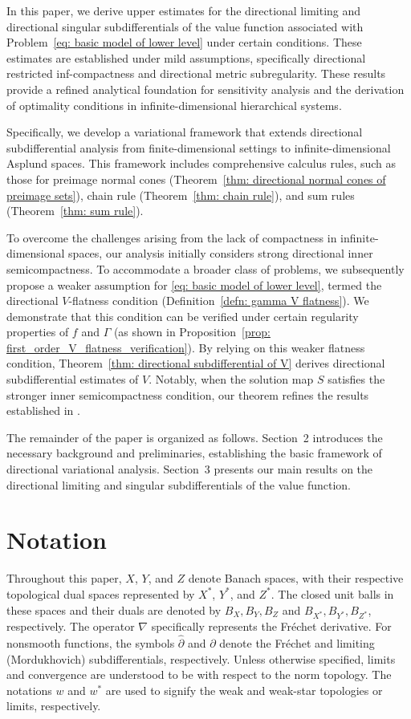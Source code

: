 \documentclass[12pt,twoside,reqno]{amsart}
\theoremstyle{definition}
\numberwithin{equation}{section}
\begin{document}
In this paper, we derive upper estimates for the directional limiting and directional singular subdifferentials of the value function associated with Problem~\eqref{eq: basic model of lower level} under certain conditions. These estimates are established under mild assumptions, specifically directional restricted inf-compactness and directional metric subregularity. These results provide a refined analytical foundation for sensitivity analysis and the derivation of optimality conditions in infinite-dimensional hierarchical systems.

Specifically, we develop a variational framework that extends directional subdifferential analysis from finite-dimensional settings to infinite-dimensional Asplund spaces. This framework includes comprehensive calculus rules, such as those for preimage normal cones (Theorem~\ref{thm: directional normal cones of preimage sets}), chain rule (Theorem~\ref{thm: chain rule}), and sum rules (Theorem~\ref{thm: sum rule}).

To overcome the challenges arising from the lack of compactness in infinite-dimensional spaces, our analysis initially considers strong directional inner semicompactness. To accommodate a broader class of problems, we subsequently propose a weaker assumption for \eqref{eq: basic model of lower level}, termed the directional $V$-flatness condition (Definition~\ref{defn: gamma V flatness}). We demonstrate that this condition can be verified under certain regularity properties of $f$ and $\Gamma$ (as shown in Proposition~\ref{prop: first_order_V_flatness_verification}). By relying on this weaker flatness condition, Theorem~\ref{thm: directional subdifferential of V} derives directional subdifferential estimates of \(V\). Notably, when the solution map $S$ satisfies the stronger inner semicompactness condition, our theorem refines the results established in \cite[Theorems~5.10 and~5.11]{long2017calculus}. 

The remainder of the paper is organized as follows. 
Section~2 introduces the necessary background and preliminaries, establishing the basic framework of directional variational analysis. 
Section~3 presents our main results on the directional limiting and singular subdifferentials of the value function. 

\section*{Notation}
Throughout this paper, $X$, $Y$, and $Z$ denote Banach spaces, with their respective topological dual spaces represented by $X^*$, $Y^*$, and $Z^*$. The closed unit balls in these spaces and their duals are denoted by $B_X, B_Y, B_Z$ and $B_{X^*}, B_{Y^*}, B_{Z^*}$, respectively. The operator $\nabla$ specifically represents the Fr\'echet derivative. For nonsmooth functions, the symbols $\hat{\partial}$ and $\partial$ denote the Fr\'echet and limiting (Mordukhovich) subdifferentials, respectively. Unless otherwise specified, limits and convergence are understood to be with respect to the norm topology. The notations $w$ and $w^*$ are used to signify the weak and weak-star topologies or limits, respectively. 
\end{document}

